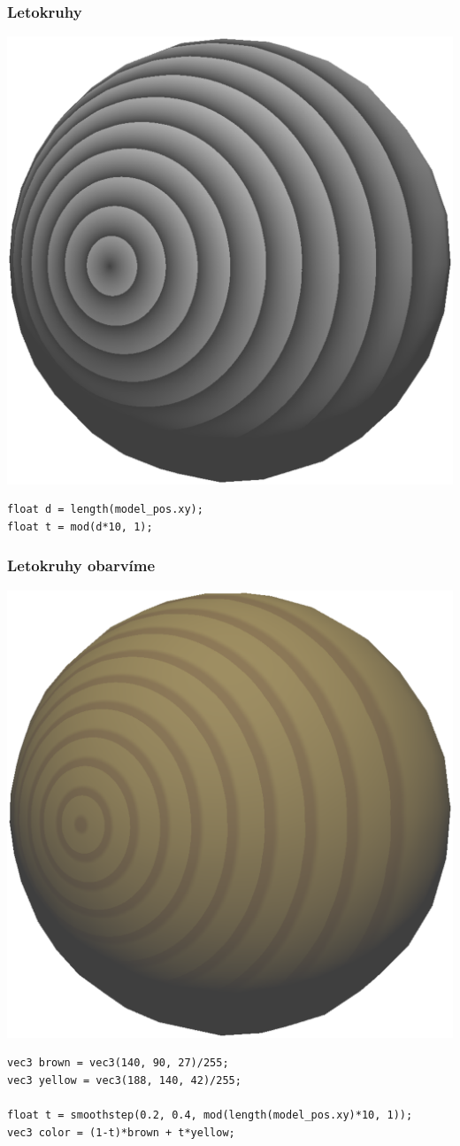\begin{frame}[fragile]
    \frametitle{Letokruhy}
    \includegraphics[width=.5\textwidth]{pics/procedural/letokruhy.eps}

  \begin{verbatim}
float d = length(model_pos.xy);
float t = mod(d*10, 1);
  \end{verbatim}
\end{frame}

\begin{frame}[fragile]
    \frametitle{Letokruhy obarvíme}
    \includegraphics[width=.5\textwidth]{pics/procedural/letokruhy_barva.eps}

  \begin{verbatim}
vec3 brown = vec3(140, 90, 27)/255;
vec3 yellow = vec3(188, 140, 42)/255;

float t = smoothstep(0.2, 0.4, mod(length(model_pos.xy)*10, 1));
vec3 color = (1-t)*brown + t*yellow;
  \end{verbatim}
\end{frame}

